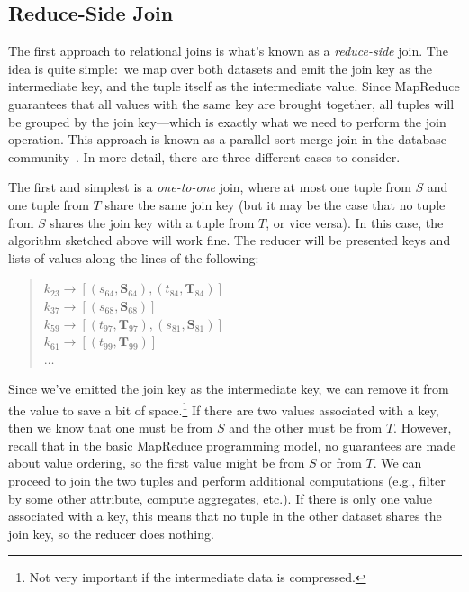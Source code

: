 \subsection{Reduce-Side Join}

The first approach to relational joins is what's known as a \emph{
  reduce-side} join.  The idea is quite simple:\ we map over both
datasets and emit the join key as the intermediate key, and the tuple
itself as the intermediate value.  Since MapReduce guarantees that all
values with the same key are brought together, all tuples will be
grouped by the join key---which is exactly what we need to perform the
join operation.  This approach is known as a parallel sort-merge join
in the database community~\cite{Schneider_DeWitt_SIGMOD1989}.  In more
detail, there are three different cases to consider.

The first and simplest is a \emph{one-to-one} join, where at most one
tuple from $S$ and one tuple from $T$ share the same join key (but
it may be the case that no tuple from $S$ shares the join key with a
tuple from $T$, or vice versa).  In this case, the algorithm sketched
above will work fine.  The reducer will be presented keys and lists of
values along the lines of the following:

\begin{quote}
$k_{23} \rightarrow [ (s_{64}, \textbf{S}_{64}), (t_{84}, \textbf{T}_{84}) ]$ \\
$k_{37} \rightarrow [ (s_{68}, \textbf{S}_{68}) ]$ \\
$k_{59} \rightarrow [ (t_{97}, \textbf{T}_{97}), (s_{81}, \textbf{S}_{81}) ]$ \\
$k_{61} \rightarrow [ (t_{99}, \textbf{T}_{99}) ]$ \\
$\ldots$
\end{quote}

\noindent Since we've emitted the join key as the intermediate key, we
can remove it from the value to save a bit of space.\footnote{Not very
  important if the intermediate data is compressed.}  If there are two
values associated with a key, then we know that one must be from $S$
and the other must be from $T$.  However, recall that in the basic
MapReduce programming model, no guarantees are made about value
ordering, so the first value might be from $S$ or from $T$.  We can
proceed to join the two tuples and perform additional computations
(e.g., filter by some other attribute, compute aggregates, etc.).  If
there is only one value associated with a key, this means that no
tuple in the other dataset shares the join key, so the reducer does
nothing.

